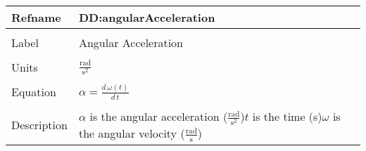 \documentclass[12pt]{article}
\begin{document}
\noindent \begin{minipage}{\textwidth}
\begin{tabular}{p{} p{}}
\toprule \textbf{Refname} & \textbf{DD:angularAcceleration}
\label{DD:angularAcceleration}
\\ \midrule \\
Label & Angular Acceleration
\\ \midrule \\
Units & $\frac{\text{rad}}{\text{s}^{2}}$
\\ \midrule \\
Equation & $\alpha{}=\frac{d\,\omega{}\left(t\right)}{d\,t}$
\\ \midrule \\
Description & $\alpha{}$ is the angular acceleration ($\frac{\text{rad}}{\text{s}^{2}}$)\newline$t$ is the time (s)\newline$\omega{}$ is the angular velocity ($\frac{\text{rad}}{\text{s}}$)
\\ \bottomrule \end{tabular}
\end{minipage}\\
~\newline
\end{document}
